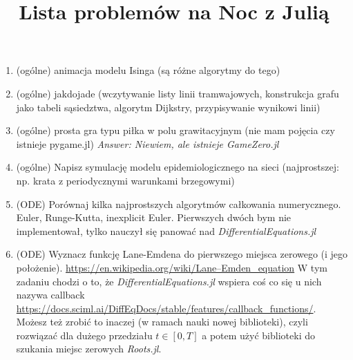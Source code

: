 \documentclass[12pt]{article}
\title{Lista problemów na Noc z Julią}
\author{}
\date{} %
\begin{document}
\maketitle %

\begin{enumerate}
\item (ogólne)
animacja modelu Isinga (są różne algorytmy do tego)
\item (ogólne)
jakdojade (wczytywanie listy linii tramwajowych, konstrukcja grafu jako tabeli sąsiedztwa, algorytm Dijkstry, przypisywanie wynikowi linii)
\item (ogólne)
prosta gra typu piłka w polu grawitacyjnym (nie mam pojęcia czy istnieje pygame.jl) \emph{Answer: Niewiem, ale istnieje GameZero.jl}
\item (ogólne)
Napisz symulację modelu epidemiologicznego na sieci (najprostszej: np. krata z periodycznymi warunkami brzegowymi)
%
%
\item (ODE)
Porównaj kilka najprostszych algorytmów całkowania numerycznego. Euler, Runge-Kutta, inexplicit Euler.
Pierwszych dwóch bym nie implementował, tylko nauczył się panować nad \emph{DifferentialEquations.jl}
\item (ODE)
Wyznacz funkcję Lane-Emdena do pierwszego miejsca zerowego (i jego położenie). \url{https://en.wikipedia.org/wiki/Lane–Emden_equation} W tym zadaniu chodzi o to, że \emph{DifferentialEquations.jl} wspiera coś co się u nich nazywa callback
\url{https://docs.sciml.ai/DiffEqDocs/stable/features/callback_functions/}.
Możesz też zrobić to inaczej (w ramach nauki nowej biblioteki), czyli rozwiązać dla dużego przedziału $t \in [0, T]$ a potem użyć biblioteki do szukania miejsc zerowych \emph{Roots.jl}.


\end{enumerate}
\end{document}
